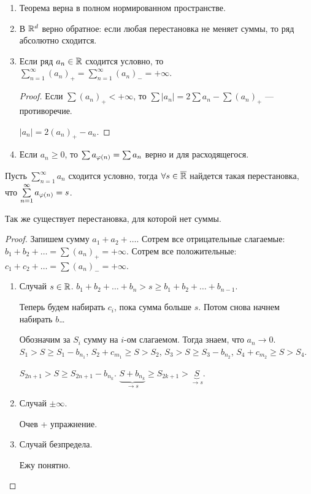 \begin{remark}
    \begin{enumerate}
        \item Теорема верна в полном нормированном пространстве.
        \item В $\mathbb{R}^d$ верно обратное: если любая перестановка не меняет суммы, то ряд абсолютно сходится.
        \item Если ряд $a_n \in \mathbb{R}$ сходится условно, то  $\sum\limits_{n=1}^\infty (a_n)_+ = \sum\limits_{n=1}^\infty (a_n)_- = +\infty$.
             \begin{proof}
                Если $\sum (a_n)_+ < +\infty$, то  $\sum |a_n| = 2 \sum a_n - \sum (a_n)_+$ --- противоречие.

                 $|a_n| = 2(a_n)_+ - a_n$.
            \end{proof}
        \item Если $a_n \ge 0$, то $\sum a_{\varphi(n)} = \sum a_n$ верно и для расходящегося.
    \end{enumerate}
\end{remark}
\begin{theorem}
    Пусть $\sum\limits_{n=1}^\infty a_n$ сходится условно, тогда  $\forall s \in \overline{\mathbb{R}}$ найдется такая перестановка, что  $\sum\limits_{n=1}^\infty a_{\varphi(n)} = s$.

    Так же существует перестановка, для которой нет суммы.
\end{theorem}
\begin{proof}
    Запишем сумму $a_1 + a_2 + \ldots$. Сотрем все отрицательные слагаемые: $b_1 + b_2 + \ldots = \sum (a_n)_+ = +\infty$. Сотрем все положительные: $c_1 + c_2 + \ldots = \sum (a_n)_- = +\infty$.
     \begin{enumerate}
         \item Случай $s \in \mathbb{R}$.  $b_1 + b_2 + \ldots + b_n > s \ge b_1 + b_2  + \ldots + b_{n-1}$.

             Теперь будем набирать $c_i$, пока сумма больше  $s$. Потом снова начнем набирать  $b$\ldots

             Обозначим за $S_i$ сумму на  $i$-ом слагаемом. Тогда знаем, что  $a_n \to 0$.  $S_1 > S \ge S_1 - b_{n_1}$, $S_2 + c_{m_1} \ge S > S_2$, $S_3 > S \ge S_3 - b_{n_2}$, $S_4 + c_{m_2} \ge S > S_4$.

             $S_{2n+1} > S \ge S_{2n+1} - b_{n_k}$. $\underbrace{S + b_{n_k}}_{\to s} \ge S_{2k+1} > \underbrace{S}_{\to s}$. 
         \item Случай $\pm \infty$.

             Очев + упражнение.
         \item Случай безпредела. 

             Ежу понятно.
    \end{enumerate}
\end{proof}
